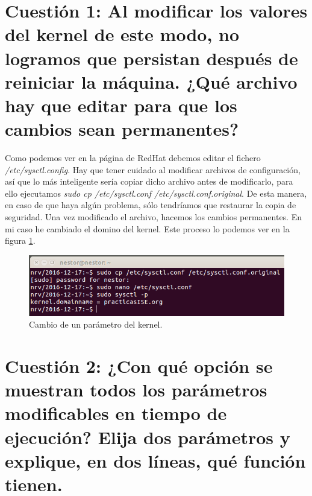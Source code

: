 \documentclass[a4paper,titlepage,12pt]{scrartcl}	%
\numberwithin{figure}{section} %
\numberwithin{table}{section} %
\begin{document}
	\tableofcontents
	\clearpage
	\listoffigures %
	\clearpage
	
	\section[Cuestión 1: Al modificar los valores del kernel de este modo, no logramos que persistan después de reiniciar la máquina. ¿Qué archivo hay que editar para que los cambios sean permanentes?]{Cuestión 1: Al modificar los valores del kernel de este modo, no logramos que persistan después de reiniciar la máquina. ¿Qué archivo hay que editar para que los cambios sean permanentes?}
	
	Como podemos ver en la página de RedHat \cite{kernel} debemos editar el fichero \textit{/etc/sysctl.config}. Hay que tener cuidado al modificar archivos de configuración, así que lo más inteligente sería copiar dicho archivo antes de modificarlo, para ello ejecutamos \textit{sudo cp /etc/sysctl.conf /etc/sysctl.conf.original}. De esta manera, en caso de que haya algún problema, sólo tendríamos que restaurar la copia de seguridad. Una vez modificado el archivo, hacemos los cambios permanentes. En mi caso he cambiado el domino del kernel. Este proceso lo podemos ver en la figura \ref{1-1}.
	
	\begin{figure}[H]
		\includegraphics[width=\linewidth]{./Imagenes/1-1.png}
		\vspace{-0.5cm}
		\caption[Cambio de un parámetro del kernel.]{Cambio de un parámetro del kernel.}
		\label{1-1}
	\end{figure}
	
	\section[Cuestión 2: Cuestión 2 : ¿Con qué opción se muestran todos los parámetros modificables en tiempo de ejecución? Elija dos parámetros y explique, en dos líneas, qué función tienen.]{Cuestión 2: ¿Con qué opción se muestran todos los parámetros modificables en tiempo de ejecución? Elija dos parámetros y explique, en dos líneas, qué función tienen.}
	
\end{document}
